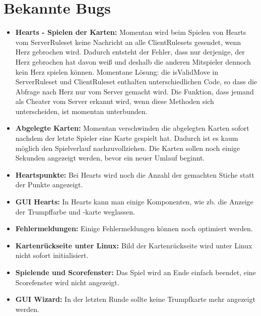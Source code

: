 \documentclass{article}
\begin{document}
\section{Bekannte Bugs}
\begin{itemize}
	\item \textbf{Hearts - Spielen der Karten:} Momentan wird beim Spielen von Hearts vom ServerRuleset keine Nachricht an alle ClientRulesets gesendet, wenn Herz gebrochen wird. Dadurch entsteht der Fehler, dass nur derjenige, der Herz gebrochen hat davon weiß und deshalb die anderen Mitspieler dennoch kein Herz spielen können. Momentane Lösung: die isValidMove in ServerRuleset und ClientRuleset enthalten unterschiedlichen Code, so dass die Abfrage nach Herz nur vom Server gemacht wird. Die Funktion, dass jemand als Cheater vom Server erkannt wird, wenn diese Methoden sich unterscheiden, ist momentan unterbunden.\\
	\item \textbf{Abgelegte Karten:} Momentan verschwinden die abgelegten Karten sofort nachdem der letzte Spieler eine Karte gespielt hat. Dadurch ist es kaum möglich den Spielverlauf nachzuvollziehen. Die Karten sollen noch einige Sekunden angezeigt werden, bevor ein neuer Umlauf beginnt. \\
	\item \textbf{Heartspunkte:} Bei Hearts wird noch die Anzahl der gemachten Stiche statt der Punkte angezeigt. \\
	\item \textbf{GUI Hearts:} In Hearts kann man einige Komponenten, wie zb. die Anzeige der Trumpffarbe und -karte weglassen. \\
	\item \textbf{Fehlermeldungen:} Einige Fehlermeldungen können noch optimiert werden. \\
	\item \textbf{Kartenrückseite unter Linux:} Bild der Kartenrückseite wird unter Linux nicht sofort initialisiert. \\
	\item \textbf{Spielende und Scorefenster:}  Das Spiel wird an Ende einfach beendet, eine Scorefenster wird nicht angezeigt.\\
	\item \textbf{GUI Wizard:} In der letzten Runde sollte keine Trumpfkarte mehr angezeigt werden.\\
\end{itemize}
\end{document}
